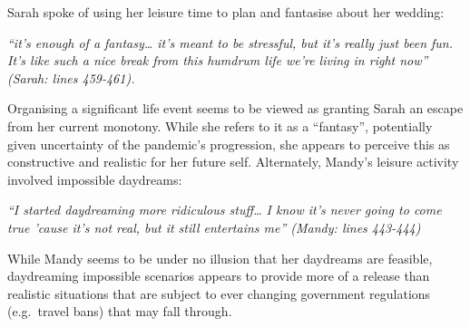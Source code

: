 \documentclass[
  english,
  letterpaper,
  DIV=11,
  numbers=noendperiod]{scrreprt}
\begin{document}
\begin{tcolorbox}[enhanced jigsaw, breakable, bottomtitle=1mm, leftrule=.75mm, opacityback=0, colbacktitle=quarto-callout-note-color!10!white, opacitybacktitle=0.6, toprule=.15mm, colback=white, left=2mm, coltitle=black, bottomrule=.15mm, titlerule=0mm, title={Extract 1 - from a study about the impact of the COVID pandemic}, toptitle=1mm, colframe=quarto-callout-note-color-frame, arc=.35mm, rightrule=.15mm]

Sarah spoke of using her leisure time to plan and fantasise about her
wedding:

\emph{``it's enough of a fantasy\ldots{} it's meant to be stressful, but
it's really just been fun. It's like such a nice break from this humdrum
life we're living in right now'' (Sarah: lines 459-461).}

Organising a significant life event seems to be viewed as granting Sarah
an escape from her current monotony. While she refers to it as a
``fantasy'', potentially given uncertainty of the pandemic's
progression, she appears to perceive this as constructive and realistic
for her future self. Alternately, Mandy's leisure activity involved
impossible daydreams:

\emph{``I started daydreaming more ridiculous stuff\ldots{} I know it's
never going to come true 'cause it's not real, but it still entertains
me'' (Mandy: lines 443-444)}

While Mandy seems to be under no illusion that her daydreams are
feasible, daydreaming impossible scenarios appears to provide more of a
release than realistic situations that are subject to ever changing
government regulations (e.g.~travel bans) that may fall through.

\end{tcolorbox}
\end{document}
